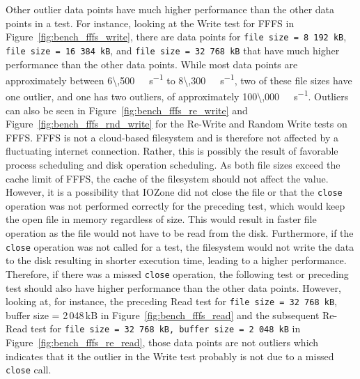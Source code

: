 Other outlier data points have much higher performance than the other data points in a test. For instance, looking at the Write test for \gls{FFFS} in Figure~\ref{fig:bench_fffs_write}, there are data points for \texttt{file size = 8\,192\,kB}, \texttt{file size = 16\,384\,kB}, and \texttt{file size = 32\,768\,kB} that have much higher performance than the other data points. While most data points are approximately between \SI[per-mode = symbol]{6\,500}{\kilo\byte\per\second} to \SI[per-mode = symbol]{8\,300}{\kilo\byte\per\second}, two of these file sizes have one outlier, and one has two outliers, of approximately \SI[per-mode = symbol]{100\,000}{\kilo\byte\per\second}. Outliers can also be seen in Figure~\ref{fig:bench_fffs_re_write} and Figure~\ref{fig:bench_fffs_rnd_write} for the \mbox{Re-Write} and Random Write tests on \gls{FFFS}. \gls{FFFS} is not a cloud-based filesystem and is therefore not affected by a fluctuating internet connection. Rather, this is possibly the result of favorable process scheduling and disk operation scheduling. As both file sizes exceed the cache limit of \gls{FFFS}, the cache of the filesystem should not affect the value. However, it is a possibility that IOZone did not close the file or that the \texttt{close} operation was not performed correctly for the preceding test, which would keep the open file in memory regardless of size. This would result in faster file operation as the file would not have to be read from the disk. Furthermore, if the \texttt{close} operation was not called for a test, the filesystem would not write the data to the disk resulting in shorter execution time, leading to a higher performance. Therefore, if there was a missed \texttt{close} operation, the following test or preceding test should also have higher performance than the other data points. However, looking at, for instance, the preceding Read test for \texttt{file size = 32\,768\,kB}, buffer size = 2\,048\,kB in Figure~\ref{fig:bench_fffs_read} and the subsequent \mbox{Re-Read} test for \texttt{file size = 32\,768\,kB, buffer size = 2\,048\,kB} in Figure~\ref{fig:bench_fffs_re_read}, those data points are not outliers which indicates that it the outlier in the Write test probably is not due to a missed \texttt{close} call.

